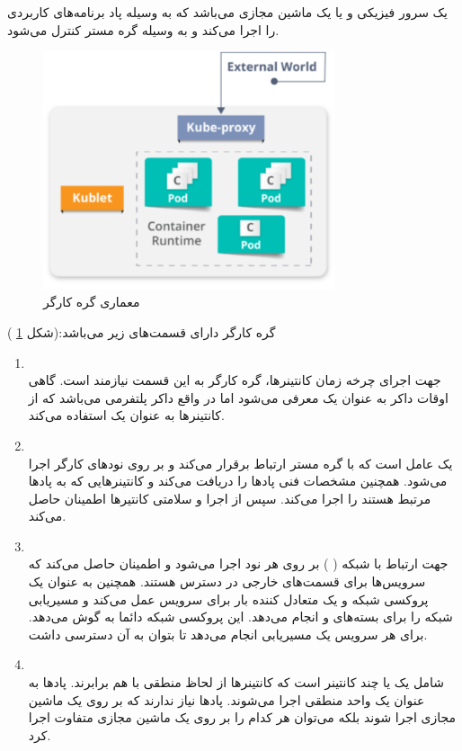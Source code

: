 یک سرور فیزیکی و یا یک ماشین مجازی می‌باشد که به وسیله پاد برنامه‌های کاربردی را اجرا می‌کند و به وسیله گره مستر کنترل می‌شود. 

\begin{figure}[!h]
	\centering
	\includegraphics[height=7cm]{fig2-12}
	\caption{ معماری گره کارگر}
	\label{تصویر 2-12}
\end{figure}

گره کارگر دارای قسمت‌های زیر می‌باشد:(شکل
\ref{تصویر 2-12}
)
\begin{enumerate}
	\item
	\\
	جهت اجرای چرخه زمان کانتینرها، گره کارگر به این قسمت نیازمند است. گاهی اوقات داکر به عنوان یک
	معرفی می‌شود اما در واقع داکر پلتفرمی می‌باشد که از کانتینرها به عنوان یک
	استفاده می‌کند. 
	
	\item
	\\
	یک عامل است که با گره مستر ارتباط برقرار می‌کند و بر روی نودهای کارگر اجرا می‌شود. همچنین مشخصات فنی پادها را دریافت می‌کند و کانتینرهایی که به پادها مرتبط هستند را اجرا می‌کند. سپس از اجرا و سلامتی کانتیرها اطمینان حاصل می‌کند.
	\item
	\\
	جهت ارتباط با شبکه (
	) بر روی هر نود اجرا می‌شود و اطمینان حاصل می‌کند که سرویس‌ها برای قسمت‌های خارجی در دسترس هستند. همچنین به عنوان یک پروکسی شبکه و یک  متعادل کننده بار برای سرویس عمل می‌کند و مسیریابی شبکه را برای بسته‌های
	و
	انجام می‌دهد. این پروکسی شبکه دائما به
	گوش می‌دهد. برای هر سرویس یک مسیریابی انجام می‌دهد تا بتوان به آن دسترسی داشت.
	\item
	\\
	شامل یک یا چند کانتینر است که کانتینرها از لحاظ منطقی با هم برابرند. پادها به عنوان یک واحد منطقی اجرا می‌شوند. پادها نیاز ندارند که بر روی یک ماشین مجازی اجرا شوند بلکه می‌توان هر کدام را بر روی یک ماشین مجازی متفاوت اجرا کرد. 
\end{enumerate}


